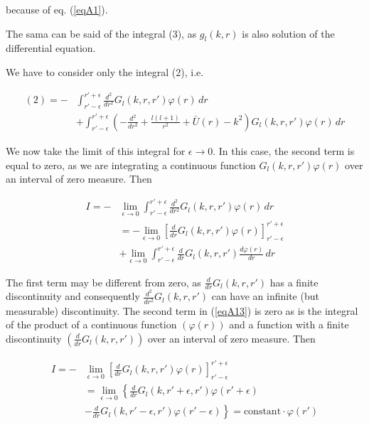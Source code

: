 because of eq. (\ref{eqA1}).

The sama can be said of the integral (3), as $g_l(k,r)$ is also solution of the differential equation.


We have to consider only the integral (2), i.e.

\begin{equation}\label{eqA12}
\begin{split}
(2)=-&\int_{r'-\epsilon}^{r'+\epsilon}  \frac{d^2}{dr^2} G_l(k,r,r') \varphi(r) \,dr \\
&+\int_{r'-\epsilon}^{r'+\epsilon} \left(-\frac{d^2}{dr^2}+ \frac{l(l+1)}{r^2}+\bar U(r)-k^2\right)
 G_l(k,r,r') \varphi(r) \,dr
\end{split}
\end{equation}

We now take the limit of this integral for $\epsilon \rightarrow 0$. In this case, the second term is equal to zero, as we are integrating a continuous function $G_l(k,r,r') \varphi(r)$ over an interval of zero measure. Then

\begin{equation}\label{eqA13}
\begin{split}
I=-&\lim_{\epsilon \rightarrow 0} \int_{r'-\epsilon}^{r'+\epsilon}  \frac{d^2}{dr^2} G_l(k,r,r') \varphi(r) \,dr \\
&=-\lim_{\epsilon \rightarrow 0} \left[ \frac{d}{dr} G_l(k,r,r') \varphi(r) \right]^{r'+\epsilon}_{r'-\epsilon}\\
&+\lim_{\epsilon \rightarrow 0} \int_{r'-\epsilon}^{r'+\epsilon}  \frac{d}{dr} G_l(k,r,r') \frac{d\varphi(r)}{dr} \,dr
\end{split}
\end{equation}

The first term may be different from zero, as $\frac{d}{dr} G_l(k,r,r')$ has a finite discontinuity and consequently $\frac{d^2}{dr^2} G_l(k,r,r')$ can have an infinite (but measurable) discontinuity. The second term in (\ref{eqA13}) is zero as is the integral of the product of a continuous function $(\varphi(r))$ and a function with a finite discontinuity $(\frac{d}{dr} G_l(k,r,r'))$ over an interval of zero measure. Then

\begin{equation}\label{eqA14}
\begin{split}
I=-& \lim_{\epsilon \rightarrow 0} \left[ \frac{d}{dr} G_l(k,r,r') \varphi(r) \right]^{r'+\epsilon}_{r'-\epsilon}\\
&= \lim_{\epsilon \rightarrow 0} \left\{ \frac{d}{dr} G_l(k,r'+\epsilon,r') \varphi(r'+\epsilon) \right. \\
&- \left.\frac{d}{dr} G_l(k,r'-\epsilon,r') \varphi(r'-\epsilon)\right\rbrace = \text{constant}\cdot\varphi(r')
\end{split}
\end{equation}

